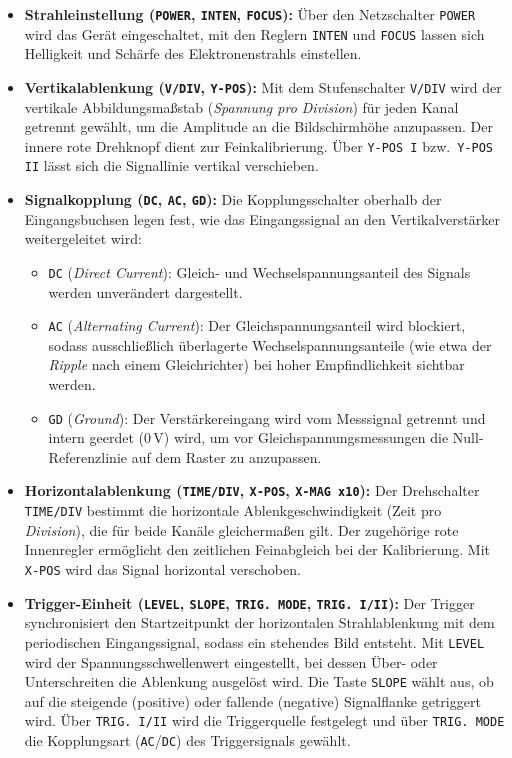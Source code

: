 \begin{itemize}
	\item \textbf{Strahleinstellung (\texttt{POWER}, \texttt{INTEN}, \texttt{FOCUS}):} Über den Netzschalter \texttt{POWER} wird das Gerät eingeschaltet, mit den Reglern \texttt{INTEN} und \texttt{FOCUS} lassen sich Helligkeit und Schärfe des Elektronenstrahls einstellen.\cite{V300}
	\item \textbf{Vertikalablenkung (\texttt{V/DIV}, \texttt{Y-POS}):} Mit dem Stufenschalter \texttt{V/DIV} wird der vertikale Abbildungsmaßstab (\textit{Spannung pro Division}) für jeden Kanal getrennt gewählt, um die Amplitude an die Bildschirmhöhe anzupassen. Der innere rote Drehknopf dient zur Feinkalibrierung. Über \texttt{Y-POS\,I} bzw.\ \texttt{Y-POS\,II} lässt sich die Signallinie vertikal verschieben.\cite{V300}
	
	\item \textbf{Signalkopplung (\texttt{DC}, \texttt{AC}, \texttt{GD}):} Die Kopplungsschalter oberhalb der Eingangsbuchsen legen fest, wie das Eingangssignal an den Vertikalverstärker weitergeleitet wird\cite{V300}:
	\begin{itemize}
		\item \texttt{DC} (\textit{Direct Current}): Gleich- und Wechselspannungsanteil des Signals werden unverändert dargestellt. \cite{V300}
		\item \texttt{AC} (\textit{Alternating Current}): Der Gleichspannungsanteil wird blockiert, sodass ausschließlich überlagerte Wechselspannungsanteile (wie etwa der \textit{Ripple} nach einem Gleichrichter) bei hoher Empfindlichkeit sichtbar werden. \cite{V300}
		\item \texttt{GD} (\textit{Ground}): Der Verstärkereingang wird vom Messsignal getrennt und intern geerdet ($0\,\text{V}$) wird, um vor Gleichspannungsmessungen die Null-Referenzlinie auf dem Raster zu anzupassen. \cite{V300}
	\end{itemize}
	
	\item \textbf{Horizontalablenkung (\texttt{TIME/DIV}, \texttt{X-POS}, \texttt{X-MAG\,x10}):} Der Drehschalter \texttt{TIME/DIV} bestimmt die horizontale Ablenkgeschwindigkeit (Zeit pro \textit{Division}), die für beide Kanäle gleichermaßen gilt. Der zugehörige rote Innenregler ermöglicht den zeitlichen Feinabgleich bei der Kalibrierung. Mit \texttt{X-POS} wird das Signal horizontal verschoben. \cite{V300}
	
	\item \textbf{Trigger-Einheit (\texttt{LEVEL}, \texttt{SLOPE}, \texttt{TRIG.\,MODE}, \texttt{TRIG.\,I/II}):} Der Trigger synchronisiert den Startzeitpunkt der horizontalen Strahlablenkung mit dem periodischen Eingangssignal, sodass ein stehendes Bild entsteht. Mit \texttt{LEVEL} wird der Spannungsschwellenwert eingestellt, bei dessen Über- oder Unterschreiten die Ablenkung ausgelöst wird. Die Taste \texttt{SLOPE} wählt aus, ob auf die steigende (positive) oder fallende (negative) Signalflanke getriggert wird. Über \texttt{TRIG.\,I/II} wird die Triggerquelle festgelegt und über \texttt{TRIG.\,MODE} die Kopplungsart (\texttt{AC}/\texttt{DC}) des Triggersignals gewählt. \cite{V300}
	

\end{itemize}
